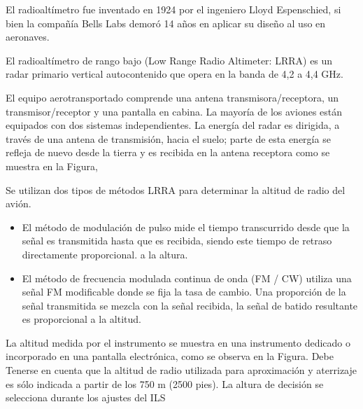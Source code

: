 
El radioaltímetro fue inventado en 1924 por el ingeniero Lloyd Espenschied, si bien la compañía Bells Labs demor\'o 14 años en aplicar su diseño al uso en aeronaves.

El radioaltímetro de rango bajo (Low Range Radio Altimeter: LRRA) es un 
radar primario  vertical autocontenido que opera en la banda de 4,2 a 4,4 GHz.

El equipo aerotransportado comprende una antena transmisora/receptora, un transmisor/receptor y
una pantalla en cabina. La mayoría de los aviones están equipados con dos sistemas independientes. 
La energía del radar es dirigida, a través de una antena de transmisión, hacia el suelo;
parte de esta energía se refleja de nuevo desde la tierra y es recibida en la antena receptora
como se muestra en la Figura,


Se utilizan dos tipos de métodos LRRA para determinar la altitud de radio del avión.

\begin{itemize}
\item El m\'etodo de modulaci\'on de pulso mide  el tiempo transcurrido desde que la señal es transmitida 
hasta que es recibida, siendo este tiempo de retraso  directamente proporcional.
a la altura. 
\item El método de frecuencia modulada continua de onda (FM / CW) utiliza una se\~nal FM modificable
donde se fija la tasa de cambio. Una proporción de la señal transmitida se mezcla con
la señal recibida,  la señal de batido resultante es proporcional a la altitud.
\end{itemize}

La altitud medida por el instrumento se muestra en una instrumento dedicado o incorporado en una pantalla electrónica, como se observa en la Figura. 
Debe Tenerse en cuenta que la altitud de radio utilizada para aproximación y 
aterrizaje es s\'olo indicada a partir de los 750 m (2500 pies). 
La altura de decisión se selecciona durante los ajustes del ILS

